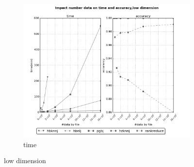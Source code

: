 \documentclass[10pt,a4paper]{article}
\begin{document}
\begin{figure}[ht]
\begin{subfigure}[b]{0.3\textwidth}
        \end{subfigure}%
        \begin{subfigure}[b]{0.3\textwidth}
                 \includegraphics[width=\textwidth]{../graph/geo/time.png} 
                \caption{time}
        \end{subfigure}%
        \caption{low dimension}
  \end{figure}
  
\end{document}
